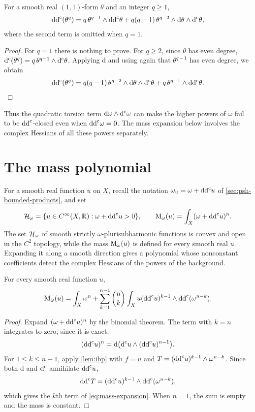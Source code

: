 \begin{lemma}\label{lem:power-torsion}
For a smooth real $(1,1)$-form $\theta$ and an integer $q\geq1$,
\[
 \mathrm{dd}^{\mathrm{c}}(\theta^q)
 =q\,\theta^{q-1}\wedge\mathrm{dd}^{\mathrm{c}}\theta
 +q(q-1)\,\theta^{q-2}\wedge \mathrm{d}\theta\wedge\mathrm d^{\mathrm c}\theta,
\]
where the second term is omitted when $q=1$.
\end{lemma}
\begin{proof}
For $q=1$ there is nothing to prove. For $q\geq2$, since $\theta$ has even degree, $\mathrm d^{\mathrm c}(\theta^q)=q\,\theta^{q-1}\wedge\mathrm d^{\mathrm c}\theta$. Applying $\mathrm{d}$ and using again that $\theta^{q-1}$ has even degree, we obtain
\[
 \mathrm{d}\mathrm d^{\mathrm c}(\theta^q)
 =q(q-1)\,\theta^{q-2}\wedge \mathrm{d}\theta\wedge\mathrm d^{\mathrm c}\theta
 +q\,\theta^{q-1}\wedge \mathrm{d}\mathrm d^{\mathrm c}\theta.
\]
\end{proof}

Thus the quadratic torsion term $\mathrm{d}\omega\wedge\mathrm d^{\mathrm c}\omega$ can make the higher powers of $\omega$ fail to be $\mathrm{dd}^{\mathrm{c}}$-closed even when $\mathrm{dd}^{\mathrm{c}}\omega=0$. The mass expansion below involves the complex Hessians of all these powers separately.

\section{The mass polynomial}

For a smooth real function $u$ on $X$, recall the notation $\omega_u=\omega+\mathrm{dd}^{\mathrm{c}} u$ of \cref{sec:psh-bounded-products}, and set
\[
 \mathcal H_\omega=\{u\in C^\infty(X,\mathbb R):\omega+\mathrm{dd}^{\mathrm{c}} u>0\},
 \qquad \mathrm M_\omega(u)=\int_X(\omega+\mathrm{dd}^{\mathrm{c}} u)^n.
\]
The set $\mathcal H_\omega$ of smooth strictly $\omega$-plurisubharmonic functions is convex and open in the $C^2$ topology, while the mass $\mathrm M_\omega(u)$ is defined for every smooth real $u$. Expanding it along a smooth direction gives a polynomial whose nonconstant coefficients detect the complex Hessians of the powers of the background.

\begin{theorem}\label{thm:mass-expansion}
For every smooth real function $u$,
\begin{equation}\label{eq:mass-expansion}
 \mathrm M_\omega(u)=\int_X\omega^n+
 \sum_{k=1}^{n-1}\binom nk
 \int_X u(\mathrm{dd}^{\mathrm{c}} u)^{k-1}\wedge\mathrm{dd}^{\mathrm{c}}(\omega^{n-k}).
\end{equation}
\end{theorem}
\begin{proof}
Expand $(\omega+\mathrm{dd}^{\mathrm{c}} u)^n$ by the binomial theorem. The term with $k=n$ integrates to zero, since it is exact:
\[
 (\mathrm{dd}^{\mathrm{c}} u)^n=\mathrm{d}\bigl(\mathrm d^{\mathrm c} u\wedge(\mathrm{dd}^{\mathrm{c}} u)^{n-1}\bigr).
\]
For $1\leq k\leq n-1$, apply \cref{lem:ibp} with $f=u$ and
$T=(\mathrm{dd}^{\mathrm{c}} u)^{k-1}\wedge\omega^{n-k}$. Since both $\mathrm{d}$ and $\mathrm d^{\mathrm c}$ annihilate $\mathrm{dd}^{\mathrm{c}} u$,
\[
 \mathrm{dd}^{\mathrm{c}} T=(\mathrm{dd}^{\mathrm{c}} u)^{k-1}\wedge\mathrm{dd}^{\mathrm{c}}(\omega^{n-k}),
\]
which gives the $k$th term of \eqref{eq:mass-expansion}. When $n=1$, the sum is empty and the mass is constant.
\end{proof}

